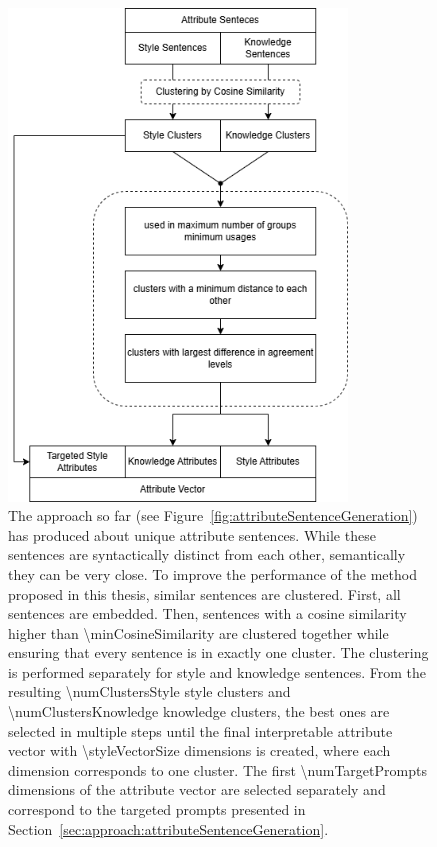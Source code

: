 \begin{figure}[h!t]
  \begin{center}
    \includegraphics[width=9cm]{figures/clustering_diagram.png}
  \end{center}
  \caption{The approach so far (see Figure~\ref{fig:attributeSentenceGeneration}) has produced about \numStyleSentencesText{} unique attribute sentences. While these sentences are syntactically distinct from each other, semantically they can be very close. To improve the performance of the method proposed in this thesis, similar sentences are clustered. First, all sentences are embedded. Then, sentences with a cosine similarity higher than \num{\minCosineSimilarity} are clustered together while ensuring that every sentence is in exactly one cluster. The clustering is performed separately for style and knowledge sentences. From the resulting \num{\numClustersStyle} style clusters and \num{\numClustersKnowledge} knowledge clusters, the best ones are selected in multiple steps until the final interpretable attribute vector with \num{\styleVectorSize} dimensions is created, where each dimension corresponds to one cluster. The first \num{\numTargetPrompts} dimensions of the attribute vector are selected separately and correspond to the targeted prompts presented in Section~\ref{sec:approach:attributeSentenceGeneration}.}
  \label{fig:clustering}
\end{figure}

